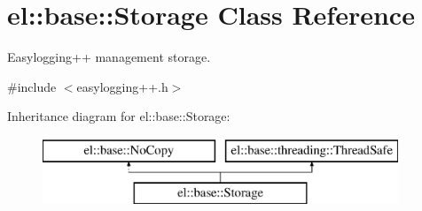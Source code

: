 \hypertarget{classel_1_1base_1_1_storage}{}\section{el\+:\+:base\+:\+:Storage Class Reference}
\label{classel_1_1base_1_1_storage}


Easylogging++ management storage.  




{\ttfamily \#include $<$easylogging++.\+h$>$}

Inheritance diagram for el\+:\+:base\+:\+:Storage\+:\begin{figure}[H]
\begin{center}
\leavevmode
\includegraphics[height=2.000000cm]{classel_1_1base_1_1_storage}
\end{center}
\end{figure}

